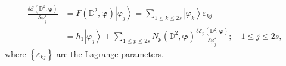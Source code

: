 \documentclass[aps,preprint]{revtex4}%
\begin{document}
\begin{align}
\frac{\delta\mathcal{E}\left(  \mathbb{D}^{2},\mathbf{\varphi}\right)
}{\delta\varphi_{j}^{\ast}}  &  =F\left(  \mathbb{D}^{2},\mathbf{\varphi
}\right)  \left\vert \varphi_{j}\right\rangle =\sum_{1\leq k\leq2s}\left\vert
\varphi_{k}\right\rangle \varepsilon_{kj}\nonumber\\
&  =h_{1}\left\vert \varphi_{j}\right\rangle +\sum_{1\leq p\leq2s}N_{p}\left(
\mathbb{D}^{2},\mathbf{\varphi}\right)  \frac{\delta\mathcal{E}_{p}\left(
\mathbb{D}^{2},\mathbf{\varphi}\right)  }{\delta\varphi_{j}^{\ast}};\quad1\leq
j\leq2s,
\end{align}
where $\left\{  \varepsilon_{kj}\right\}  $ are the Lagrange parameters.



\end{document}
